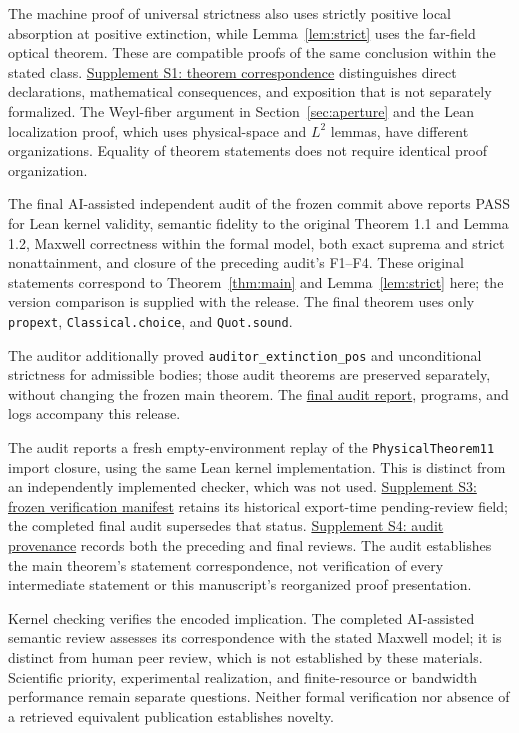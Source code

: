 \documentclass[11pt]{article}
\begin{document}
The machine proof of universal strictness also uses strictly positive local absorption at positive extinction, while Lemma~\ref{lem:strict} uses the far-field optical theorem. These are compatible proofs of the same conclusion within the stated class. \href{theorem-correspondence.html}{Supplement S1: theorem correspondence} distinguishes direct declarations, mathematical consequences, and exposition that is not separately formalized. The Weyl-fiber argument in Section~\ref{sec:aperture} and the Lean localization proof, which uses physical-space and $L^2$ lemmas, have different organizations. Equality of theorem statements does not require identical proof organization.

The final AI-assisted independent audit of the frozen commit above reports PASS for Lean kernel validity, semantic fidelity to the original Theorem 1.1 and Lemma 1.2, Maxwell correctness within the formal model, both exact suprema and strict nonattainment, and closure of the preceding audit's F1--F4. These original statements correspond to Theorem~\ref{thm:main} and Lemma~\ref{lem:strict} here; the version comparison is supplied with the release. The final theorem uses only \texttt{propext}, \texttt{Classical.choice}, and \texttt{Quot.sound}. 

The auditor additionally proved \texttt{auditor\_extinction\_pos} and unconditional strictness for admissible bodies; those audit theorems are preserved separately, without changing the frozen main theorem. The \href{reproducibility/AUDIT_REPORT_686402a.md}{final audit report}, programs, and logs accompany this release.

The audit reports a fresh empty-environment replay of the \texttt{PhysicalTheorem11} import closure, using the same Lean kernel implementation. This is distinct from an independently implemented checker, which was not used. \href{reproducibility/manifest.json}{Supplement S3: frozen verification manifest} retains its historical export-time pending-review field; the completed final audit supersedes that status. \href{reproducibility/AUDIT_PROVENANCE.md}{Supplement S4: audit provenance} records both the preceding and final reviews. The audit establishes the main theorem's statement correspondence, not verification of every intermediate statement or this manuscript's reorganized proof presentation.

Kernel checking verifies the encoded implication. The completed AI-assisted semantic review assesses its correspondence with the stated Maxwell model; it is distinct from human peer review, which is not established by these materials. Scientific priority, experimental realization, and finite-resource or bandwidth performance remain separate questions. Neither formal verification nor absence of a retrieved equivalent publication establishes novelty.
\end{document}
